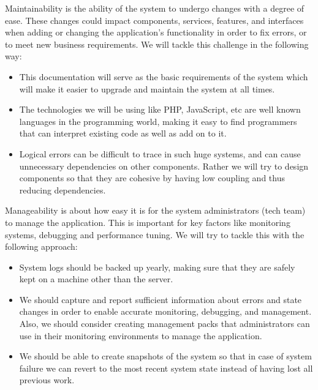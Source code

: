 \documentclass[11pt]{article}
\begin{document}
		Maintainability is the ability of the system to undergo changes with a degree of ease. These changes could impact components, services, features, and interfaces when adding or changing the application’s functionality in order to fix errors, or to meet new business requirements. We will tackle this challenge in the following way:
		\begin{itemize}
			\item This documentation will serve as the basic requirements of the system which will make it easier to upgrade and maintain the system at all times.
			
			\item The technologies we will be using like PHP, JavaScript, etc are well known languages in the programming world, making it easy to find programmers that can interpret existing code as well as add on to it.
			
			\item Logical errors can be difficult to trace in such huge systems, and can cause unnecessary dependencies on other components. Rather we will try to design components so that they are cohesive by having low coupling and thus reducing dependencies.
		\end{itemize}
		
			Manageability is about how easy it is for the system administrators (tech team) to manage the application. This is important for key factors like monitoring systems, debugging and performance tuning. We will try to tackle this with the following approach:
			\begin{itemize}
				\item System logs should be backed up yearly, making sure that they are safely kept on a machine other than the server.
				
				\item We should capture and report sufficient information about errors and state changes in order to enable accurate monitoring, debugging, and management. Also, we should consider creating management packs that administrators can use in their monitoring environments to manage the application.
				
				\item We should be able to create snapshots of the system so that in case of system failure we can revert to the most recent system state instead of having lost all previous work.
			\end{itemize}
			
\end{document}
